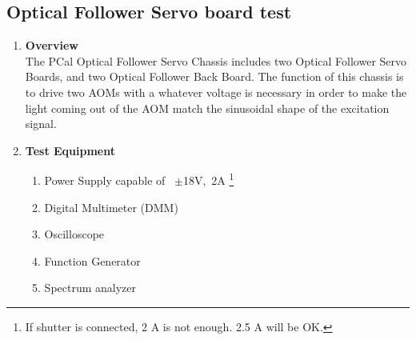 \subsection{Optical Follower Servo board test}
\begin{enumerate}
	\item \textbf{Overview}\\
	The PCal Optical Follower Servo Chassis includes two Optical Follower Servo Boards, and two Optical Follower Back Board. The function of this chassis is to drive two AOMs with a whatever voltage is necessary in order to make the light coming out of the AOM match the sinusoidal shape of the excitation signal.
	\item \textbf{Test Equipment}
	\begin{enumerate}
		\item Power Supply capable of ~$\pm$18V,~2A \footnote{If shutter is connected, 2 A is not enough. 2.5 A will be OK.}
		\item Digital Multimeter (DMM)
		\item Oscilloscope
		\item Function Generator
		\item Spectrum analyzer
	\end{enumerate}
	

\end{enumerate}
